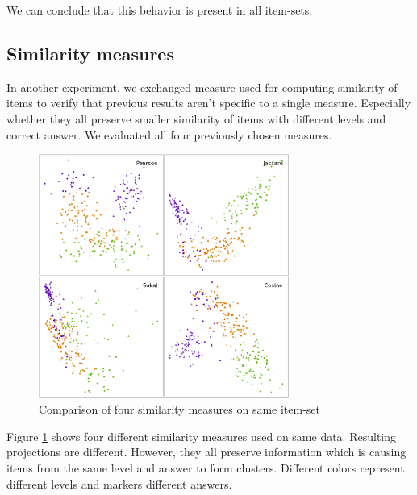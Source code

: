 \documentclass[
  digital, %
  table,   %
  nolof,     %
  nolot,     %
  nocover,
  color,
  final, %
]{fithesis3}
\begin{document}

We can conclude that this behavior is present in all item-sets.


\subsection{Similarity measures}\label{evaluation-similarity-measures}

In another experiment, we exchanged measure used for computing similarity of items to verify that previous results aren't specific to a single measure. Especially whether they all preserve smaller similarity of items with different levels and correct answer. We evaluated all four previously chosen measures.

\begin{figure}
  \includegraphics[height=8cm]{img/measures}
  \caption{Comparison of four similarity measures on same item-set}
  \label{fig:measures}
\end{figure}


Figure \ref{fig:measures} shows four different similarity measures used on same data. Resulting projections are different. However, they all preserve information which is causing items from the same level and answer to form clusters. Different colors represent different levels and markers different answers.
\end{document}
